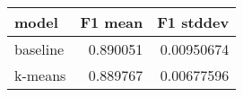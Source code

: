 \begin{tabular}{lrr}
\toprule
 model    &   F1 mean &   F1 stddev \\
\midrule
 baseline &  0.890051 &  0.00950674 \\
 k-means  &  0.889767 &  0.00677596 \\
\bottomrule
\end{tabular}